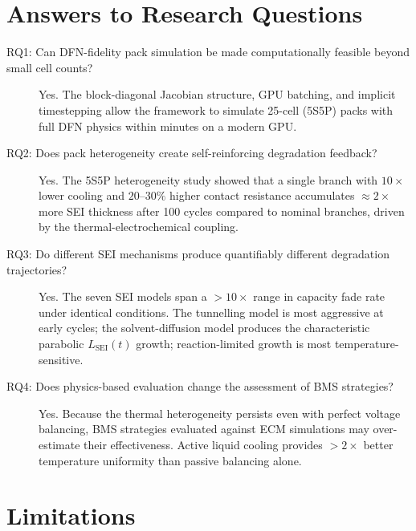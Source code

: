 \section{Answers to Research Questions}

\begin{description}
  \item[RQ1: Can DFN-fidelity pack simulation be made computationally feasible beyond small cell counts?]
  Yes. The block-diagonal Jacobian structure, GPU batching, and implicit timestepping allow the framework to simulate 25-cell (5S5P) packs with full DFN physics within minutes on a modern GPU.

  \item[RQ2: Does pack heterogeneity create self-reinforcing degradation feedback?]
  Yes. The 5S5P heterogeneity study showed that a single branch with $10\times$ lower cooling and $20$--$30\%$ higher contact resistance accumulates $\approx 2\times$ more SEI thickness after 100 cycles compared to nominal branches, driven by the thermal-electrochemical coupling.

  \item[RQ3: Do different SEI mechanisms produce quantifiably different degradation trajectories?]
  Yes. The seven SEI models span a $>10\times$ range in capacity fade rate under identical conditions. The tunnelling model is most aggressive at early cycles; the solvent-diffusion model produces the characteristic parabolic $L_\text{SEI}(t)$ growth; reaction-limited growth is most temperature-sensitive.

  \item[RQ4: Does physics-based evaluation change the assessment of BMS strategies?]
  Yes. Because the thermal heterogeneity persists even with perfect voltage balancing, BMS strategies evaluated against ECM simulations may over-estimate their effectiveness. Active liquid cooling provides $>2\times$ better temperature uniformity than passive balancing alone.
\end{description}

\section{Limitations}

